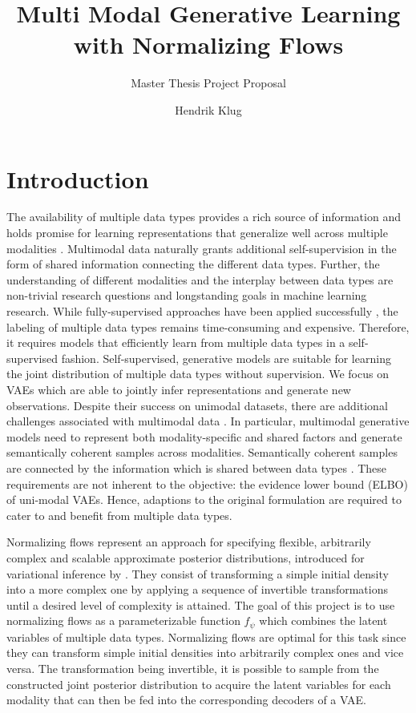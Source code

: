 \documentclass[english]{scrartcl}
\title{Multi Modal Generative Learning with Normalizing Flows}
\subtitle{Master Thesis Project Proposal}
\author{Hendrik Klug}
\begin{document}
    \maketitle


    \section{Introduction}
    The availability of multiple data types provides a rich source of information and holds promise for learning representations that generalize well across multiple modalities \cite{baltrusaitis_multimodal_2019}.
    Multimodal data naturally grants additional self-supervision in the form of shared information connecting the different data types.
    Further, the understanding of different modalities and the interplay between data types are non-trivial research questions and longstanding goals in machine learning research.
    While fully-supervised approaches have been applied successfully \parencite{karpathy_deep_2015,tsai_learning_2018}, the labeling of multiple data types remains time-consuming and expensive.
    Therefore, it requires models that efficiently learn from multiple data types in a self-supervised fashion.
    Self-supervised, generative models are suitable for learning the joint distribution of multiple data types without supervision.
    We focus on VAEs \parencite{kingma_auto-encoding_2014,rezende_stochastic_2014} which are able to jointly infer representations and generate new observations.
    Despite their success on unimodal datasets, there are additional challenges associated with multimodal data \parencite{suzuki_joint_2016, vedantam_generative_2018}.
    In particular, multimodal generative models need to represent both modality-specific and shared factors and generate semantically coherent samples across modalities.
    Semantically coherent samples are connected by the information which is shared between data types \parencite{shi_variational_2019}.
    These requirements are not inherent to the objective: the evidence lower bound (ELBO) of uni-modal VAEs.
    Hence, adaptions to the original formulation are required to cater to and benefit from multiple data types.

    Normalizing flows represent an approach for specifying flexible, arbitrarily complex and scalable approximate posterior distributions, introduced for variational inference by \cite{rezende_variational_2016}.
    They consist of transforming a simple initial density into a more complex one by applying a sequence of invertible transformations until a desired level of complexity is attained.
    The goal of this project is to use normalizing flows as a parameterizable function $f_\psi$ which combines the latent variables of multiple data types.
    Normalizing flows are optimal for this task since they can transform simple initial densities into arbitrarily complex ones and vice versa.
    The transformation being invertible, it is possible to sample from the constructed joint posterior distribution to acquire the latent variables for each modality that can then be fed into the corresponding decoders of a VAE.
\end{document}
